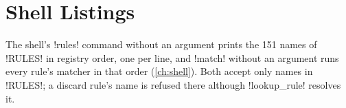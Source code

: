 \section{Shell Listings}\label{sec:app-rules-shell}

The shell's \azx!rules! command without an argument prints the 151 names of \py!RULES! in registry order, one per line, and \azx!match! without an argument runs every rule's matcher in that order (\cref{ch:shell}). Both accept only names in \py!RULES!; a discard rule's name is refused there although \py!lookup_rule! resolves it.
